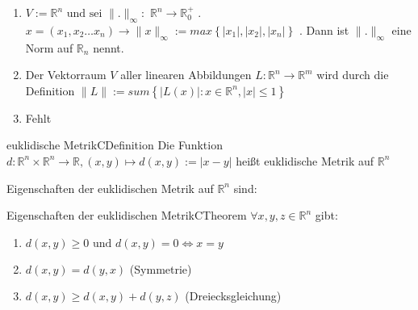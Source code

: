 \documentclass[11.5 pt, a4paper]{memoir}
\begin{document}

\begin{enumerate}[label=\alph*)]
    \item $ V := \mathbb{R}^{n} \text{ und sei } \|. \|_{\infty}:$
        $\mathbb{R}^{n} \to \mathbb{R}_{0}^+$ . $ x = \left( x_1,x_2 \dots
        x_{n}\right) \to \|x \|_{\infty}:= max \left\{ \left| x_1 \right| , \left| x_2 \right|, \left| x_{n} \right| \right\}$ . Dann ist $ \|. \|_{
    \infty}$ eine Norm auf $ \mathbb{R}_{n} $ nennt.
    \item Der Vektorraum $ V $ aller linearen Abbildungen $ L : \mathbb{R}^n
        \to \mathbb{R}^m$ wird durch die Definition $ \|L \|:= sum \left\{ 
        \left| L(x)\right| : x \in \mathbb{R}^{n}, \left| x \right| 
    \leq 1 \right\}  $ 
    \item Fehlt
\end{enumerate}

\begin{ibox}{euklidische Metrik}{CDefinition}
    Die Funktion $ d: \mathbb{R}^{n}\times \mathbb{R}^{n} \to \mathbb{R}
, (x,y) \mapsto d(x,y) := |x-y|$ heißt euklidische Metrik auf
$ \mathbb{R}^{n}$
\end{ibox}
Eigenschaften der euklidischen Metrik auf $ \mathbb{R}^{n} $ sind:
\begin{ibox}{Eigenschaften der euklidischen Metrik}{CTheorem}
    $ \forall x,y,z \in \mathbb{R}^{n} $ gibt:
    \begin{enumerate}[label=\alph*)]
        \item $ d(x,y) \geq 0 \text{ und } d(x,y) = 0 \iff x = y $ 
        \item $ d(x,y) = d(y,x) $ (Symmetrie)
        \item $ d(x,y) \geq d(x,y) + d(y,z) $ (Dreiecksgleichung)
    \end{enumerate}
    
\end{ibox}
\end{document}
